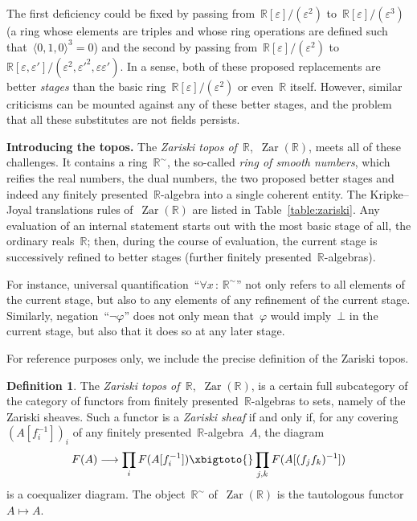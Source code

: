 \documentclass[oneside,reqno]{amsart}
\theoremstyle{definition}
\newtheorem{defn}{Definition}[section]
\theoremstyle{plain}
\theoremstyle{remark}
\newcommand{\RR}{\mathbb{R}}
\DeclareMathOperator{\Zar}{Zar}
\renewcommand{\_}{\mathpunct{.}\,}
\newcommand{\?}{\,{:}\,}
\renewcommand{\paragraph}[1]{\noindent\textbf{#1.}}
\begin{document}
The first deficiency could be fixed by passing
from~$\RR[\varepsilon]/(\varepsilon^2)$ to~$\RR[\varepsilon]/(\varepsilon^3)$
(a ring whose elements are triples and whose ring operations are defined such
that~$\langle0,1,0\rangle^3 = 0$) and the second by passing
from~$\RR[\varepsilon]/(\varepsilon^2)$
to~$\RR[\varepsilon,\varepsilon']/(\varepsilon^2,\varepsilon'^2,\varepsilon\varepsilon')$.
In a sense, both of these proposed replacements are better \emph{stages} than
the basic ring~$\RR[\varepsilon]/(\varepsilon^2)$ or even~$\RR$ itself. However,
similar criticisms can be mounted against any of these better stages, and the
problem that all these substitutes are not fields persists.

\bigskip
\paragraph{Introducing the topos}
The \emph{Zariski topos of~$\RR$},~$\Zar(\RR)$, meets all of these challenges. It
contains a ring~$\RR^\sim$, the so-called \emph{ring of smooth numbers}, which reifies
the real numbers, the dual numbers, the two proposed better stages and indeed
any finitely presented~$\RR$-algebra into a single coherent entity. The
Kripke--Joyal translations rules of~$\Zar(\RR)$ are listed in
Table~\ref{table:zariski}. Any evaluation of an internal statement starts out
with the most basic stage of all, the ordinary reals~$\RR$; then, during the
course of evaluation, the current stage is successively refined to better
stages (further finitely presented~$\RR$-algebras).

For instance, universal quantification~``$\forall x \? \RR^\sim$'' not only refers to
all elements of the current stage, but also to any elements of any refinement
of the current stage. Similarly, negation~``$\neg\varphi$'' does not only mean
that~$\varphi$ would imply~$\bot$ in the current stage, but also that it does
so at any later stage.

For reference purposes only, we include the precise definition of the Zariski topos.
\begin{defn}The \emph{Zariski topos of~$\RR$},~$\Zar(\RR)$, is a certain full subcategory of
the category of functors from finitely presented~$\RR$-algebras to sets, namely of
the Zariski sheaves. Such a functor is a \emph{Zariski sheaf} if and only if,
for any covering~$(A[f_i^{-1}])_i$ of any finitely presented~$\RR$-algebra~$A$,
the diagram
\[ F(A) \longrightarrow \prod_i F(A[f_i^{-1}]) \xbigtoto{} \prod_{j,k}
F(A[(f_jf_k)^{-1}]) \]
is a coequalizer diagram. The object~$\RR^\sim$ of~$\Zar(\RR)$ is the tautologous functor~$A \mapsto A$.
\end{defn}
\end{document}
